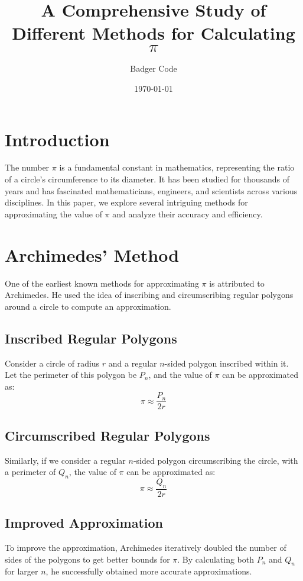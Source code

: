 \documentclass{article}
\begin{document}
\title{A Comprehensive Study of Different Methods for Calculating $\pi$}
\author{Badger Code}
\date{\today}

\maketitle

\section{Introduction}
The number $\pi$ is a fundamental constant in mathematics, representing the ratio of a circle's circumference to its diameter. It has been studied for thousands of years and has fascinated mathematicians, engineers, and scientists across various disciplines. In this paper, we explore several intriguing methods for approximating the value of $\pi$ and analyze their accuracy and efficiency.

\section{Archimedes' Method}
One of the earliest known methods for approximating $\pi$ is attributed to Archimedes. He used the idea of inscribing and circumscribing regular polygons around a circle to compute an approximation.

\subsection{Inscribed Regular Polygons}
Consider a circle of radius $r$ and a regular $n$-sided polygon inscribed within it. Let the perimeter of this polygon be $P_n$, and the value of $\pi$ can be approximated as:
\[
\pi \approx \frac{P_n}{2r}
\]

\subsection{Circumscribed Regular Polygons}
Similarly, if we consider a regular $n$-sided polygon circumscribing the circle, with a perimeter of $Q_n$, the value of $\pi$ can be approximated as:
\[
\pi \approx \frac{Q_n}{2r}
\]

\subsection{Improved Approximation}
To improve the approximation, Archimedes iteratively doubled the number of sides of the polygons to get better bounds for $\pi$. By calculating both $P_n$ and $Q_n$ for larger $n$, he successfully obtained more accurate approximations.
\end{document}
